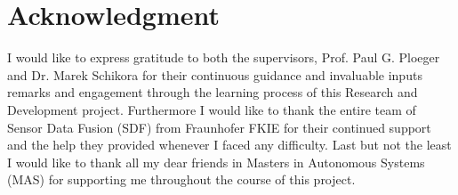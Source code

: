 \section{Acknowledgment}

I would like to express gratitude to both the supervisors, Prof. Paul G. Ploeger and Dr. Marek Schikora for their continuous guidance and invaluable inputs remarks and engagement through the learning process of this Research and Development project. Furthermore I would like to thank the entire team of Sensor Data Fusion (SDF) from Fraunhofer FKIE for their continued support and the help they provided whenever I faced any difficulty. Last but not the least I would like to thank all my dear friends in Masters in Autonomous Systems (MAS) for supporting me throughout the course of this project.